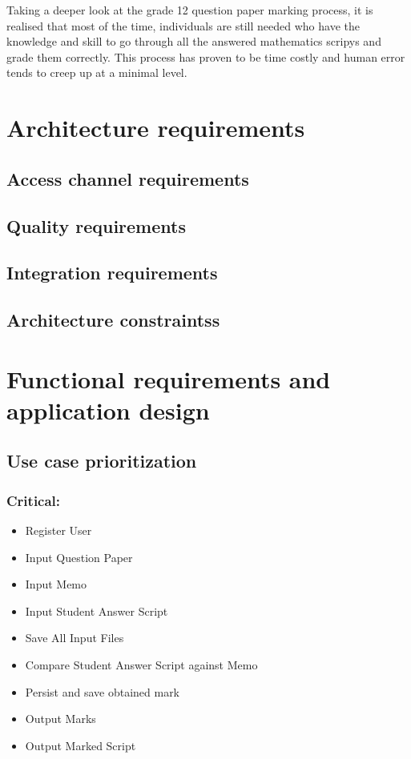 \documentclass{article}
\begin{document}
Taking a deeper look at the grade 12 question paper marking process, it is realised that most of the time, individuals are still needed who have the knowledge and skill to go through all the answered mathematics scripys and grade them correctly. This process has proven to be time costly and human error tends to creep up at a minimal level.

\section{Architecture requirements}

	\subsection{Access channel requirements}
	\subsection{Quality requirements}	
	\subsection{Integration requirements}
	\subsection{Architecture constraintss}	
\section{Functional requirements and application design}

	\subsection{Use case prioritization}

		\subsubsection{Critical:}
			\begin{itemize}
				\item Register User
				\item Input Question Paper
				\item Input Memo
				\item Input Student Answer Script
				\item Save All Input Files
				\item Compare Student Answer Script against Memo
				\item Persist and save obtained mark
				\item Output Marks
				\item Output Marked Script
			\end{itemize}
\end{document}
